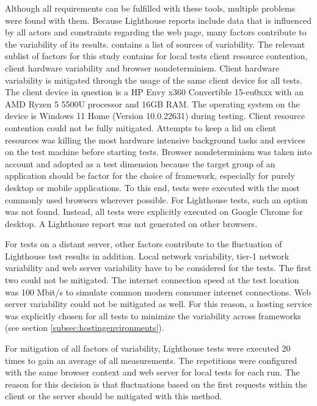 \documentclass[a4paper, 10pt]{article}
\begin{document}
Although all requirements can be fulfilled with these tools, multiple problems were found with them.
Because Lighthouse reports include data that is influenced by all actors and constraints regarding the web page, many factors contribute to the variability of its results.
\cite{lighthouseVariability} contains a list of sources of variability.
The relevant sublist of factors for this study contains for local tests client resource contention, client hardware variability and browser nondeterminism.
Client hardware variability is mitigated through the usage of the same client device for all tests.
The client device in question is a HP Envy x360 Convertible 15-eu0xxx with an AMD Ryzen 5 5500U processor and 16GB RAM.
The operating system on the device is Windows 11 Home (Version 10.0.22631) during testing.
Client resource contention could not be fully mitigated.
Attempts to keep a lid on client resources was killing the most hardware intensive background tasks and services on the test machine before starting tests.
Browser nondeterminism was taken into account and adopted as a test dimension because the target group of an application should be factor for the choice of framework, especially for purely desktop or mobile applications.
To this end, tests were executed with the most commonly used browsers wherever possible.
For Lighthouse tests, such an option was not found.
Instead, all tests were explicitly executed on Google Chrome for desktop.
A Lighthouse report was not generated on other browsers.

For tests on a distant server, other factors contribute to the fluctuation of Lighthouse test results in addition.
Local network variability, tier-1 network variability and web server variability have to be considered for the tests.
The first two could not be mitigated.
The internet connection speed at the test location was 100 Mbit/s to simulate common modern consumer internet connections. %
Web server variability could not be mitigated as well.
For this reason, a hosting service was explicitly chosen for all tests to minimize the variability across frameworks (see section \ref{subsec:hostingenvironments}).

For mitigation of all factors of variability, Lighthouse tests were executed 20 times to gain an average of all measurements.
The repetitions were configured with the same browser context and web server for local tests for each run.
The reason for this decision is that fluctuations based on the first requests within the client or the server should be mitigated with this method.
\end{document}
